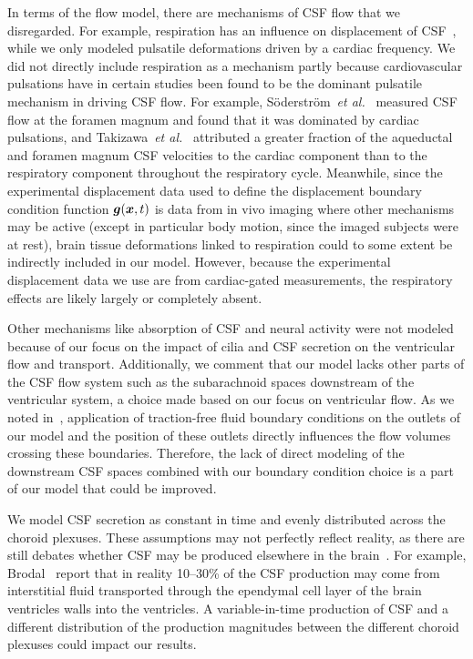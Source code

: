 \documentclass{template}
\begin{document}
In terms of the flow model, there are mechanisms of CSF flow that we disregarded.
For example, respiration has an influence on displacement of CSF~\citep{Vinje2019RespiratoryMeasurements,
DrehaKulaczewski2015},
while we only modeled pulsatile deformations driven by a cardiac frequency.
We did not directly include respiration as a mechanism partly because cardiovascular pulsations
have in certain studies been found to be the dominant pulsatile mechanism
in driving CSF flow. For example, Söderström~\emph{et al.}~\citep{Soderstrom2025}
measured CSF flow at the foramen magnum and found that it was dominated by cardiac pulsations,
and Takizawa~\emph{et al.}~\citep{Takizawa2017} attributed a greater fraction of the aqueductal and foramen
magnum CSF velocities to the cardiac component than to the respiratory component throughout
the respiratory cycle.
Meanwhile, since the experimental displacement data
used to define the displacement boundary condition function $\bm{g}(\bm{x}, t)$ is data from
in vivo imaging where other mechanisms may be active
(except in particular body motion, since the imaged subjects were at rest), brain tissue deformations
linked to respiration could to some extent be indirectly included in our model. However, because
the experimental displacement data we use are from cardiac-gated measurements, the respiratory
effects are likely largely or completely absent.

Other mechanisms like absorption of CSF and neural activity were not modeled because 
of our focus on the impact of cilia and CSF secretion on the ventricular flow and transport.
Additionally, we comment that our model lacks other parts of the CSF flow system such
as the subarachnoid spaces downstream of the ventricular system, a choice made based on our focus on ventricular flow.
As we noted in~, application of traction-free fluid boundary conditions on the outlets of our model
and the position of these outlets directly influences the flow volumes crossing these boundaries.
Therefore, the lack of direct modeling of the downstream CSF spaces
combined with our boundary condition choice is a part of our model that could be improved.

We model CSF secretion as constant in time and evenly distributed
across the choroid plexuses. These assumptions may not perfectly reflect
reality, as there are still debates whether CSF may be produced
elsewhere in the brain~\citep{miyajima2015evaluation}.
For example, Brodal~\citep{Brodal2016TheSystem}
report that in reality 10--30\% of the CSF production
may come from interstitial fluid transported through the ependymal cell
layer of the brain ventricles walls into the ventricles.
A variable-in-time production of CSF and a different distribution of the production
magnitudes between the different choroid plexuses could impact our results. 
\end{document}
